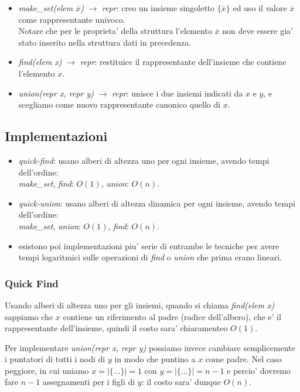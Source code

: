 \documentclass{article}
\begin{document}
\begin{itemize}
  \item \emph{make\_set(elem $\overline{x}$)} $\rightarrow$ \emph{repr}: creo un insieme
    singoletto $\{ \overline{x}\}$ ed uso il valore $\overline{x}$ come rappresentante univoco. \\
    Notare che per le proprieta' della struttura l'elemento $\overline{x}$ non deve
    essere gia' stato inserito nella struttura dati in precedenza.
  \item \emph{find(elem x)} $\rightarrow$ \emph{repr}: restituice il rappresentante
    dell'insieme che contiene l'elemento $x$.
  \item \emph{union(repr x, repr y)} $\rightarrow$ \emph{repr}: unisce i due insiemi
    indicati da $x$ e $y$, e scegliamo come nuovo rappresentante canonico quello
    di $x$.
\end{itemize}

\subsection{Implementazioni}

\begin{itemize}
  \item \emph{quick-find}: usano alberi di altezza uno per ogni insieme, avendo tempi dell'ordine: \\
    \emph{make\_set}, \emph{find}: $O(1)$, \emph{union}: $O(n)$.
  \item \emph{quick-union}: usano alberi di altezza dinamica per ogni insieme, avendo tempi dell'ordine: \\
    \emph{make\_set}, \emph{union}: $O(1)$, \emph{find}: $O(n)$.
  \item esistono poi implementazioni piu' serie di entrambe le tecniche per avere
    tempi logaritmici sulle operazioni di \emph{find} o \emph{union} che prima erano lineari.
\end{itemize}

\subsubsection{Quick Find}

Usando alberi di altezza uno per gli insiemi, quando si chiama \emph{find(elem x)}
sappiamo che $x$ contiene un riferimento al padre (radice dell'albero), che e'
il rappresentante dell'insieme, quindi il costo sara' chiaramenteo $O(1)$.

Per implementare \emph{union(repr x, repr y)} possiamo invece cambiare semplicemente
i puntatori di tutti i nodi di $y$ in modo che puntino a $x$ come padre. Nel caso
peggiore, in cui uniamo $x = |\{\ldots\}| = 1$ con $y = |\{\ldots\}| = n-1$ e
percio' dovremo fare $n-1$ assegnamenti per i figli di $y$: il costo sara' dunque $O(n)$.
\end{document}
